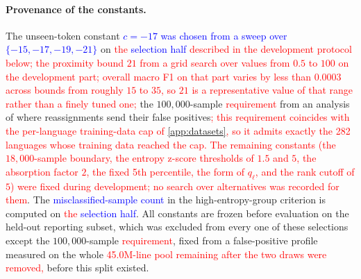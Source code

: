 \documentclass{article}
\newcommand{\camrev}[1]{\textcolor{red}{#1}}
\newcommand{\corrrev}[1]{\textcolor{blue}{#1}}
\newcommand{\lang}{\ell}
\begin{document}
\paragraph{Provenance of the constants.} The unseen-token constant
\corrrev{$c = -17$ was chosen from a sweep over $\{-15, -17, -19, -21\}$} on \camrev{the
\corrrev{selection half} described in the development protocol below;
the proximity bound $21$ from a grid search over values from $0.5$ to $100$
on the development part; overall macro F1 on that part varies by less than
$0.0003$ across bounds from roughly $15$ to $35$, so $21$ is a
representative value of that range rather than a finely tuned one;} the
$100{,}000$-sample \camrev{requirement} from an analysis of where reassignments send their
false positives\camrev{; this requirement coincides with the per-language
training-data cap of \cref{app:datasets}, so it admits exactly the 282
languages whose training data reached the cap. The remaining constants (the
$18{,}000$-sample boundary, the entropy z-score thresholds of $1.5$ and
$5$, the absorption factor $2$, the fixed 5th percentile, the form of
$q_\lang$, and the rank cutoff of $5$) were fixed during development; no
search over alternatives was recorded for them}. The
\corrrev{misclassified-sample count} in the
high-entropy-group criterion is computed on \camrev{the \corrrev{selection
half}}. All
constants are frozen before evaluation on the held-out reporting subset,
which was excluded from every one of these selections except the
$100{,}000$-sample \camrev{requirement}, fixed from a false-positive profile measured on the
whole \camrev{45.0M-line pool remaining after the two draws were removed,}
before this split existed.
\end{document}
